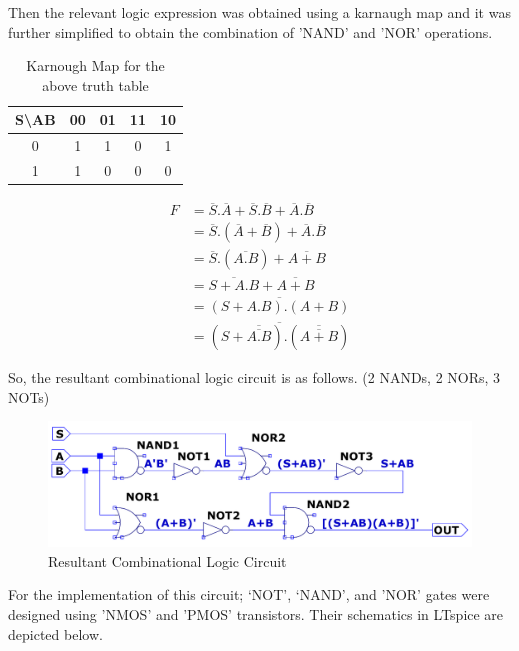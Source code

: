 \documentclass[a4paper,11pt]{article}%
\begin{document}
Then the relevant logic expression was obtained using a karnaugh map and it was further simplified to obtain the combination of 'NAND' and 'NOR' operations.

\begin{table}[H]
	\centering
	\begin{tabular}{c |c| c| c| c}
		S\textbackslash AB & 00 & 01 & 11 & 10\\\hline
		0 & 1 & 1 & 0 & 1\\\hline
		1 & 1 & 0  &0  & 0
	\end{tabular}
	\caption{Karnough Map for the above truth table}
\end{table}

\[
\begin{split}
	F &= \overline{S}.\overline{A} + \overline{S}.\overline{B} + \overline{A}.\overline{B}\\
	&= \overline{S}.(\overline{A}+\overline{B}) + \overline{A}.\overline{B}\\
	&= \overline{S}.(\overline{A.B}) + \overline{A+B}\\
	&= \overline{S+A.B} + \overline{A+B}\\
	& = \overline{(S + A.B).(A+B)}\\
	& =\overline{(S + \overline{\overline{A.B}}).(\overline{\overline{A+B}})}
\end{split}
\]



So, the resultant combinational logic circuit is as follows. (2 NANDs, 2 NORs, 3 NOTs)

\begin{figure}[H]
	\centering
	\includegraphics[scale=0.5]{figures/PLD_cct.pdf}
	\caption{Resultant Combinational Logic Circuit}
\end{figure}


For the implementation of this circuit; ‘NOT’, ‘NAND’, and 'NOR' gates were designed using 'NMOS' and 'PMOS' transistors. Their schematics in LTspice are depicted below.
\end{document}
